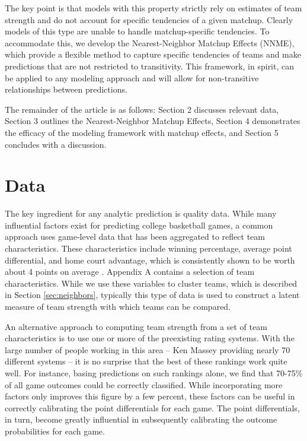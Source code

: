 \documentclass[letterpaper,12pt]{article}
\begin{document}
The key point is that models with this property strictly rely on estimates of team strength and do not account for specific tendencies of a given matchup. Clearly models of this type are unable to handle matchup-specific tendencies. To accommodate this, we develop the Nearest-Neighbor Matchup Effects (NNME), which provide a flexible method to capture specific tendencies of teams and make predictions that are not restricted to transitivity. This framework, in spirit, can be applied to any modeling approach and will allow for non-transitive relationships between predictions.

The remainder of the article is as follows: Section 2 discusses relevant data, Section 3 outlines the Nearest-Neighbor Matchup Effects, Section 4 demonstrates the efficacy of the modeling framework with matchup effects, and Section 5 concludes with a discussion.
\section{Data}
The key ingredient for any analytic prediction is quality data. While many influential factors exist for predicting college basketball games, a common approach uses game-level data that has been aggregated to reflect team characteristics. These characteristics include winning percentage, average point differential, and home court advantage, which is consistently shown to be worth about 4 points on average \citep{harville1994}. Appendix A contains a selection of team characteristics. While we use these variables to cluster teams, which is described in Section \ref{sec:neighbors}, typically this type of data is used to construct a latent measure of team strength with which teams can be compared. 

An alternative approach to computing team strength from a set of team characteristics is to use one or more of the preexisting rating systems. With the large number of people working in this area -- Ken Massey \citep{kenmassey.com} providing nearly 70 different systems -- it is no surprise that the best of these rankings work quite well. For instance, basing predictions on such rankings alone, we find that 70-75\% of all game outcomes could be correctly classified. While incorporating more factors only improves this figure by a few percent, these factors can be useful in correctly calibrating the point differentials for each game. The point differentials, in turn, become greatly influential in subsequently calibrating the outcome probabilities for each game.
\end{document}
